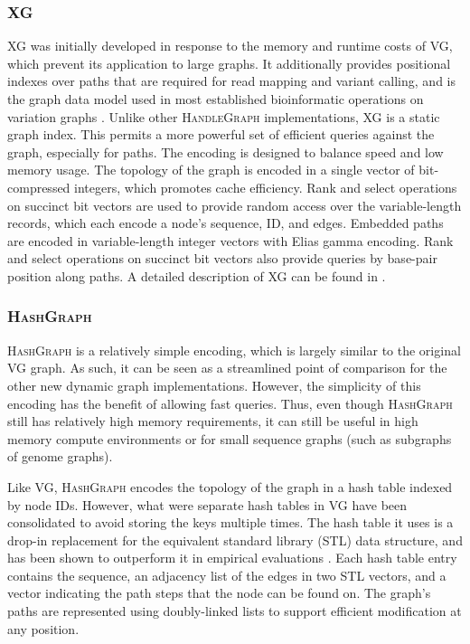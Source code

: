 \documentclass[11pt]{ucthesis}
\begin{document}
\subsubsection{\textsc{XG}}

\textsc{XG} was initially developed in response to the memory and runtime costs of \textsc{VG}, which prevent its application to large graphs.
It additionally provides positional indexes over paths that are required for read mapping and variant calling, and is the graph data model used in most established bioinformatic operations on variation graphs \cite{garrison2018variation,hickey2020genotyping}.
Unlike other \textsc{HandleGraph} implementations, \textsc{XG} is a static graph index.
This permits a more powerful set of efficient queries against the graph, especially for paths.
The encoding is designed to balance speed and low memory usage.
The topology of the graph is encoded in a single vector of bit-compressed integers, which promotes cache efficiency.
Rank and select operations on succinct bit vectors are used to provide random access over the variable-length records, which each encode a node's sequence, ID, and edges.
Embedded paths are encoded in variable-length integer vectors with Elias gamma encoding.
Rank and select operations on succinct bit vectors also provide queries by base-pair position along paths.
A detailed description of \textsc{XG} can be found in \cite{Garrison_2019}.

\subsubsection{\textsc{HashGraph}}

\textsc{HashGraph} is a relatively simple encoding, which is largely similar to the original \textsc{VG} graph.
As such, it can be seen as a streamlined point of comparison for the other new dynamic graph implementations.
However, the simplicity of this encoding has the benefit of allowing fast queries.
Thus, even though \textsc{HashGraph} still has relatively high memory requirements, it can still be useful in high memory compute environments or for small sequence graphs (such as subgraphs of genome graphs).

Like \textsc{VG}, \textsc{HashGraph} encodes the topology of the graph in a hash table indexed by node IDs.
However, what were separate hash tables in \textsc{VG} have been consolidated to avoid storing the keys multiple times.
The hash table it uses is a drop-in replacement for the equivalent standard library (STL) data structure, and has been shown to outperform it in empirical evaluations \cite{brehm2019hash}.
Each hash table entry contains the sequence, an adjacency list of the edges in two STL vectors, and a vector indicating the path steps that the node can be found on.
The graph's paths are represented using doubly-linked lists to support efficient modification at any position.
\end{document}
